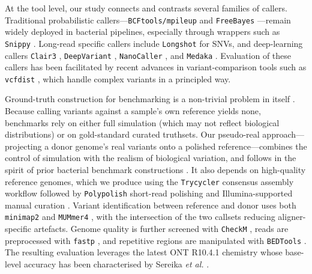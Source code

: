 At the tool level, our study connects and contrasts several families of callers. Traditional probabilistic callers---\texttt{BCFtools/mpileup} \citep{danecek2021bcftools} and \texttt{FreeBayes} \citep{garrison2012freebayes}---remain widely deployed in bacterial pipelines, especially through wrappers such as \texttt{Snippy} \citep{seemann_snippy}. Long-read specific callers include \texttt{Longshot} \citep{edge2019longshot} for SNVs, and deep-learning callers \texttt{Clair3} \citep{zheng2022clair3}, \texttt{DeepVariant} \citep{poplin2018deepvariant}, \texttt{NanoCaller} \citep{ahsan2021nanocaller}, and \texttt{Medaka} \citep{ont_medaka}. Evaluation of these callers has been facilitated by recent advances in variant-comparison tools such as \texttt{vcfdist} \citep{dunn2024vcfdist}, which handle complex variants in a principled way.

Ground-truth construction for benchmarking is a non-trivial problem in itself \citep{olson2022giab}. Because calling variants against a sample's own reference yields none, benchmarks rely on either full simulation (which may not reflect biological distributions) or on gold-standard curated truthsets. Our pseudo-real approach---projecting a donor genome's real variants onto a polished reference---combines the control of simulation with the realism of biological variation, and follows in the spirit of prior bacterial benchmark constructions \citep{bush2020genomic}. It also depends on high-quality reference genomes, which we produce using the \texttt{Trycycler} consensus assembly workflow \citep{wick2021trycycler} followed by \texttt{Polypolish} short-read polishing \citep{wick2022polypolish} and Illumina-supported manual curation \citep{wick2023perfect}. Variant identification between reference and donor uses both \texttt{minimap2} \citep{li2018minimap2} and \texttt{MUMmer4} \citep{marcais2018mummer4}, with the intersection of the two callsets reducing aligner-specific artefacts. Genome quality is further screened with \texttt{CheckM} \citep{parks2015checkm}, reads are preprocessed with \texttt{fastp} \citep{chen2018fastp}, and repetitive regions are manipulated with \texttt{BEDTools} \citep{quinlan2010bedtools}. The resulting evaluation leverages the latest ONT R10.4.1 chemistry whose base-level accuracy has been characterised by Sereika \emph{et al.} \citep{sereika2022oxford}.
